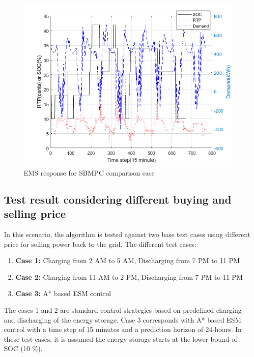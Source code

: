  \begin{figure}[!ht]
    \centering
    \includegraphics[width = \linewidth]{figs/SBMPO_COMP_10_12.png}
    \caption{EMS response for SBMPC comparison case}
    \label{fig:SBMPO_COMP_10_12}
\end{figure}


\subsection{Test result considering different buying and selling price}
In this scenario, the algorithm is tested against two base test cases using different price for selling power back to the grid. The different test cases:
\begin{enumerate}

\item \textbf{Case 1:} Charging from 2 AM to 5 AM, Discharging from 7 PM to 11 PM

\item \textbf{Case 2:} Charging from 11 AM to 2 PM, Discharging from 7 PM to 11 PM

\item \textbf{Case 3:}  A* based ESM control
\end{enumerate}

The cases 1 and 2 are standard control strategies based on predefined charging and discharging of the energy storage. Case 3 corresponds with A* based ESM control with a time step of 15 minutes and a prediction horizon of 24-hours. In these test cases, it is assumed the energy storage starts at the lower bound of SOC (10 \%).

